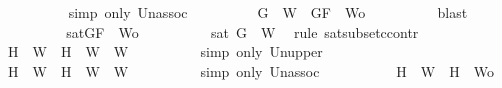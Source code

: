 \begin{isabellebody}
\ \ \ \ \ \ \ \ \isamarkupfalse%
\ {\isacharparenleft}simp\ only{\isacharcolon}\ Un{\isacharunderscore}assoc{\isacharparenright}\isanewline
\ \ \ \ \ \ \isamarkupfalse%
\ \isamarkupfalse%
\ {\isachardoublequoteopen}{\isacharbraceleft}G{\isacharbraceright}\ {\isasymunion}\ W{}\ {\isasymsubseteq}\ {\isacharbraceleft}G{\isacharcomma}F{\isacharbraceright}\ {\isasymunion}\ {\isacharquery}Wo{\isachardoublequoteclose}\isanewline
\ \ \ \ \ \ \ \ \isamarkupfalse%
\ blast\isanewline
\ \ \ \ \ \ \isamarkupfalse%
\ \isamarkupfalse%
\ {}{\isacharcolon}{\isachardoublequoteopen}{\isasymnot}{\isacharparenleft}sat{\isacharparenleft}{\isacharbraceleft}G{\isacharcomma}F{\isacharbraceright}\ {\isasymunion}\ {\isacharquery}Wo{\isacharparenright}{\isacharparenright}{\isachardoublequoteclose}\isanewline
\ \ \ \ \ \ \ \ \isamarkupfalse%
\ {\isacartoucheopen}{\isasymnot}sat\ {\isacharparenleft}{\isacharbraceleft}G{\isacharbraceright}\ {\isasymunion}\ W{}{\isacharparenright}{\isacartoucheclose}\ \isamarkupfalse%
\ {\isacharparenleft}rule\ sat{\isacharunderscore}subset{\isacharunderscore}ccontr{\isacharparenright}\isanewline
\ \ \ \ \ \ \isamarkupfalse%
\ {\isachardoublequoteopen}{\isacharbraceleft}H{\isacharbraceright}\ {\isasymunion}\ W{}\ {\isasymsubseteq}\ {\isacharparenleft}{\isacharbraceleft}H{\isacharbraceright}\ {\isasymunion}\ W{}{\isacharparenright}\ {\isasymunion}\ W{}{\isachardoublequoteclose}\isanewline
\ \ \ \ \ \ \ \ \isamarkupfalse%
\ {\isacharparenleft}simp\ only{\isacharcolon}\ Un{\isacharunderscore}upper{}{\isacharparenright}\isanewline
\ \ \ \ \ \ \isamarkupfalse%
\ \isamarkupfalse%
\ {\isachardoublequoteopen}{\isacharbraceleft}H{\isacharbraceright}\ {\isasymunion}\ W{}\ {\isasymsubseteq}\ {\isacharbraceleft}H{\isacharbraceright}\ {\isasymunion}\ {\isacharparenleft}W{}\ {\isasymunion}\ W{}{\isacharparenright}{\isachardoublequoteclose}\isanewline
\ \ \ \ \ \ \ \ \isamarkupfalse%
\ {\isacharparenleft}simp\ only{\isacharcolon}\ Un{\isacharunderscore}assoc{\isacharparenright}\ \isanewline
\ \ \ \ \ \ \isamarkupfalse%
\ \isamarkupfalse%
\ {\isachardoublequoteopen}{\isacharbraceleft}H{\isacharbraceright}\ {\isasymunion}\ W{}\ {\isasymsubseteq}\ {\isacharbraceleft}H{\isacharbraceright}\ {\isasymunion}\ {\isacharquery}Wo{\isachardoublequoteclose}\isanewline

\end{isabellebody}
